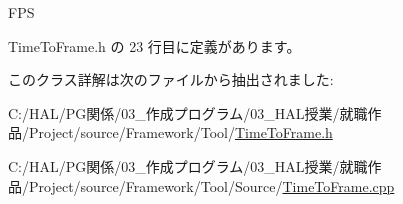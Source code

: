 F\+PS 



 Time\+To\+Frame.\+h の 23 行目に定義があります。



このクラス詳解は次のファイルから抽出されました\+:\begin{DoxyCompactItemize}
\item 
C\+:/\+H\+A\+L/\+P\+G関係/03\+\_\+作成プログラム/03\+\_\+\+H\+A\+L授業/就職作品/\+Project/source/\+Framework/\+Tool/\mbox{\hyperlink{_time_to_frame_8h}{Time\+To\+Frame.\+h}}\item 
C\+:/\+H\+A\+L/\+P\+G関係/03\+\_\+作成プログラム/03\+\_\+\+H\+A\+L授業/就職作品/\+Project/source/\+Framework/\+Tool/\+Source/\mbox{\hyperlink{_time_to_frame_8cpp}{Time\+To\+Frame.\+cpp}}\end{DoxyCompactItemize}
